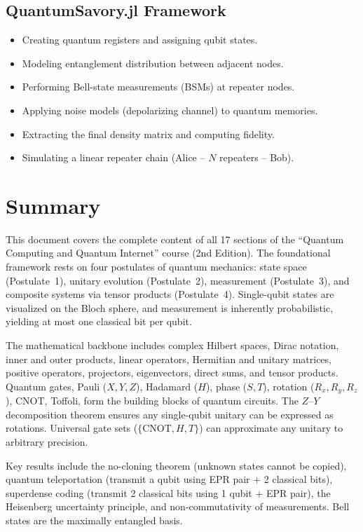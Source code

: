 \documentclass[10pt,a4paper]{article}
\begin{document}
\subsection{QuantumSavory.jl Framework}

\begin{itemize}[nosep]
\item Creating quantum registers and assigning qubit states.
\item Modeling entanglement distribution between adjacent nodes.
\item Performing Bell-state measurements (BSMs) at repeater nodes.
\item Applying noise models (depolarizing channel) to quantum memories.
\item Extracting the final density matrix and computing fidelity.
\item Simulating a linear repeater chain (Alice -- $N$ repeaters -- Bob).
\end{itemize}

\section{Summary}

This document covers the complete content of all 17 sections of the ``Quantum Computing and Quantum Internet'' course (2nd Edition). The foundational framework rests on four postulates of quantum mechanics: state space (Postulate~1), unitary evolution (Postulate~2), measurement (Postulate~3), and composite systems via tensor products (Postulate~4). Single-qubit states are visualized on the Bloch sphere, and measurement is inherently probabilistic, yielding at most one classical bit per qubit.

The mathematical backbone includes complex Hilbert spaces, Dirac notation, inner and outer products, linear operators, Hermitian and unitary matrices, positive operators, projectors, eigenvectors, direct sums, and tensor products. Quantum gates, Pauli ($X,Y,Z$), Hadamard ($H$), phase ($S,T$), rotation ($R_x,R_y,R_z$), CNOT, Toffoli, form the building blocks of quantum circuits. The $Z$--$Y$ decomposition theorem ensures any single-qubit unitary can be expressed as rotations. Universal gate sets ($\{\mathrm{CNOT},H,T\}$) can approximate any unitary to arbitrary precision.

Key results include the no-cloning theorem (unknown states cannot be copied), quantum teleportation (transmit a qubit using EPR pair + 2 classical bits), superdense coding (transmit 2 classical bits using 1 qubit + EPR pair), the Heisenberg uncertainty principle, and non-commutativity of measurements. Bell states are the maximally entangled basis.
\end{document}
